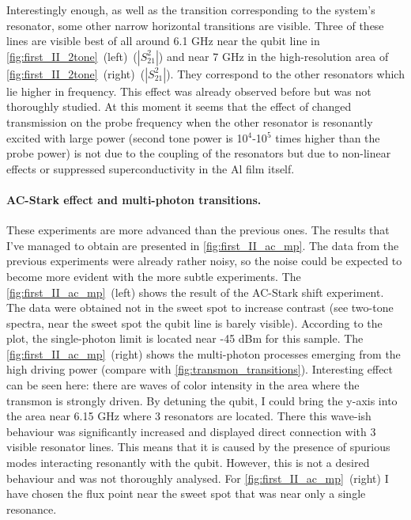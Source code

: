 \documentclass[12pt, twoside]{report}
\numberwithin{equation}{section}
\begin{document}
Interestingly enough, as well as the transition corresponding to the system's resonator, some other narrow horizontal transitions are visible. Three of these lines are visible best of all around 6.1 GHz near the qubit line in \autoref{fig:first_II_2tone}~(left)~($|S^2_{21}|$) and near 7 GHz in the high-resolution area of \autoref{fig:first_II_2tone}~(right)~($|S^2_{21}|$). They correspond to the other resonators which lie higher in frequency. This effect was already observed before but was not thoroughly studied. At this moment it seems that the effect of changed transmission on the probe frequency when the other resonator is resonantly excited with large power (second tone power is 10$^4$-10$^5$ times higher than the probe power) is not due to the coupling of the resonators but due to non-linear effects or suppressed superconductivity in the Al film itself.

\paragraph{AC-Stark effect and multi-photon transitions.} These experiments are more advanced than the previous ones. The results that I've managed to obtain are presented in \autoref{fig:first_II_ac_mp}. The data from the previous experiments were already rather noisy, so the noise could be expected to become more evident with the more subtle experiments. The \autoref{fig:first_II_ac_mp}~(left) shows the result of the AC-Stark shift experiment. The data were obtained not in the sweet spot to increase contrast (see two-tone spectra, near the sweet spot the qubit line is barely visible). According to the plot, the single-photon limit is located near -45 dBm for this sample. The \autoref{fig:first_II_ac_mp}~(right) shows the multi-photon processes emerging from the high driving power (compare with \autoref{fig:transmon_transitions}). Interesting effect can be seen here: there are waves of color intensity in the area where the transmon is strongly driven. By detuning the qubit, I could bring the y-axis into the area near 6.15 GHz where 3 resonators are located. There this wave-ish behaviour was significantly increased and displayed direct connection with 3 visible resonator lines. This means that it is caused by the presence of spurious modes interacting resonantly with the qubit. However, this is not a desired behaviour and was not thoroughly analysed. For \autoref{fig:first_II_ac_mp}~(right) I have chosen the flux point near the sweet spot that was near only a single resonance.
\end{document}
